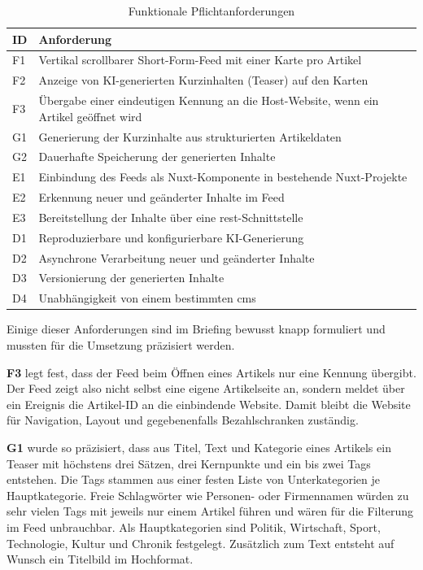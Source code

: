 \begin{table}
    \centering
    \small
    \begin{tabularx}{\textwidth}{l >{\raggedright\arraybackslash}X}
        \toprule
        \textbf{ID} & \textbf{Anforderung} \\
        \midrule
        F1 & Vertikal scrollbarer Short-Form-Feed mit einer Karte pro Artikel \\
        F2 & Anzeige von KI-generierten Kurzinhalten (Teaser) auf den Karten \\
        F3 & Übergabe einer eindeutigen Kennung an die Host-Website, wenn ein Artikel geöffnet wird \\
        G1 & Generierung der Kurzinhalte aus strukturierten Artikeldaten \\
        G2 & Dauerhafte Speicherung der generierten Inhalte \\
        E1 & Einbindung des Feeds als Nuxt-Komponente in bestehende Nuxt-Projekte \\
        E2 & Erkennung neuer und geänderter Inhalte im Feed \\
        E3 & Bereitstellung der Inhalte über eine \gls{rest}-Schnittstelle \\
        D1 & Reproduzierbare und konfigurierbare KI-Generierung \\
        D2 & Asynchrone Verarbeitung neuer und geänderter Inhalte \\
        D3 & Versionierung der generierten Inhalte \\
        D4 & Unabhängigkeit von einem bestimmten \gls{cms} \\
        \bottomrule
    \end{tabularx}
    \caption{Funktionale Pflichtanforderungen}
    \label{tab:req:functional}
\end{table}

Einige dieser Anforderungen sind im Briefing bewusst knapp formuliert und mussten für die Umsetzung präzisiert werden.

\textbf{F3} legt fest, dass der Feed beim Öffnen eines Artikels nur eine Kennung übergibt.
Der Feed zeigt also nicht selbst eine eigene Artikelseite an, sondern meldet über ein Ereignis die Artikel-ID an die einbindende Website.
Damit bleibt die Website für Navigation, Layout und gegebenenfalls Bezahlschranken zuständig.

\textbf{G1} wurde so präzisiert, dass aus Titel, Text und Kategorie eines Artikels ein Teaser mit höchstens drei Sätzen, drei Kernpunkte und ein bis zwei Tags entstehen.
Die Tags stammen aus einer festen Liste von Unterkategorien je Hauptkategorie.
Freie Schlagwörter wie Personen- oder Firmennamen würden zu sehr vielen Tags mit jeweils nur einem Artikel führen und wären für die Filterung im Feed unbrauchbar.
Als Hauptkategorien sind Politik, Wirtschaft, Sport, Technologie, Kultur und Chronik festgelegt.
Zusätzlich zum Text entsteht auf Wunsch ein Titelbild im Hochformat.

